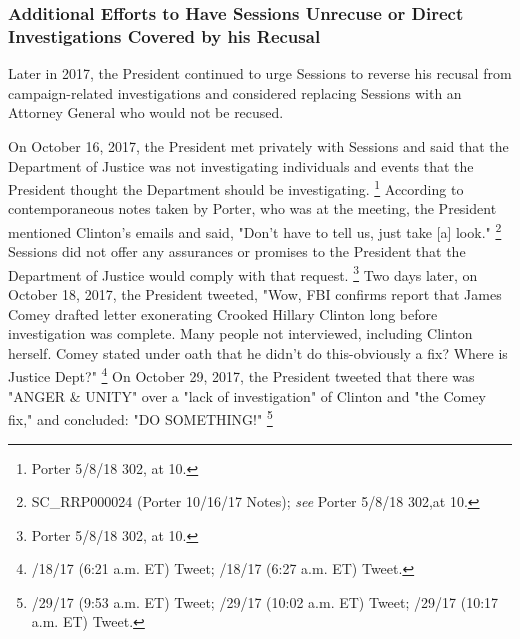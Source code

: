\subsubsection{Additional Efforts to Have Sessions Unrecuse or Direct Investigations Covered by his Recusal}

Later in 2017, the President continued to urge Sessions to reverse his recusal from campaign-related investigations and considered replacing Sessions with an Attorney General who would not be recused.

On October 16, 2017, the President met privately with Sessions and said that the Department of Justice was not investigating individuals and events that the President thought the Department should be investigating.%
\footnote{Porter 5/8/18 302, at 10.}
According to contemporaneous notes taken by Porter, who was at the meeting, the President mentioned Clinton's emails and said, "Don't have to tell us, just take [a] look."%
\footnote{SC\_RRP000024 (Porter 10/16/17 Notes);
\textit{see} Porter 5/8/18 302,at 10.}
Sessions did not offer any assurances or promises to the President that the Department of Justice would comply with that request.%
\footnote{Porter 5/8/18 302, at 10.}
Two days later, on October 18, 2017, the President tweeted, "Wow, FBI confirms report that James Comey drafted letter exonerating Crooked Hillary Clinton long before investigation was complete.
Many people not interviewed, including Clinton herself.
Comey stated under oath that he didn't do this-obviously a fix?
Where is Justice Dept?"%
\footnote{/18/17 (6:21 a.m. ET) Tweet;
/18/17 (6:27 a.m. ET) Tweet.}
On October 29, 2017, the President tweeted that there was "ANGER \& UNITY" over a "lack of investigation" of Clinton and "the Comey fix," and concluded: "DO SOMETHING!"%
\footnote{/29/17 (9:53 a.m. ET) Tweet;
/29/17 (10:02 a.m. ET) Tweet;
/29/17 (10:17 a.m. ET) Tweet.}

